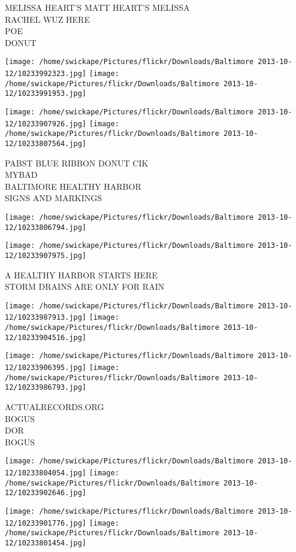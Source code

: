 \documentclass[10pt,letterpaper]{article}
\begin{document}
MELISSA HEART'S MATT HEART'S MELISSA\\
RACHEL WUZ HERE\\
POE\\
DONUT
\pagebreak

\texttt{[image: /home/swickape/Pictures/flickr/Downloads/Baltimore 2013-10-12/10233992323.jpg]}
\texttt{[image: /home/swickape/Pictures/flickr/Downloads/Baltimore 2013-10-12/10233991953.jpg]}

\texttt{[image: /home/swickape/Pictures/flickr/Downloads/Baltimore 2013-10-12/10233907926.jpg]}
\texttt{[image: /home/swickape/Pictures/flickr/Downloads/Baltimore 2013-10-12/10233807564.jpg]}

PABST BLUE RIBBON DONUT CIK\\
MYBAD\\
BALTIMORE HEALTHY HARBOR\\
SIGNS AND MARKINGS
\pagebreak

\texttt{[image: /home/swickape/Pictures/flickr/Downloads/Baltimore 2013-10-12/10233806794.jpg]}

\vspace{0.25in}
\texttt{[image: /home/swickape/Pictures/flickr/Downloads/Baltimore 2013-10-12/10233907975.jpg]}

A HEALTHY HARBOR STARTS HERE\\
STORM DRAINS ARE ONLY FOR RAIN
\pagebreak

\texttt{[image: /home/swickape/Pictures/flickr/Downloads/Baltimore 2013-10-12/10233987913.jpg]}
\texttt{[image: /home/swickape/Pictures/flickr/Downloads/Baltimore 2013-10-12/10233904516.jpg]}

\texttt{[image: /home/swickape/Pictures/flickr/Downloads/Baltimore 2013-10-12/10233906395.jpg]}
\texttt{[image: /home/swickape/Pictures/flickr/Downloads/Baltimore 2013-10-12/10233986793.jpg]}

ACTUALRECORDS.ORG\\
BOGUS\\
DOR\\
BOGUS
\pagebreak

\texttt{[image: /home/swickape/Pictures/flickr/Downloads/Baltimore 2013-10-12/10233804054.jpg]}
\texttt{[image: /home/swickape/Pictures/flickr/Downloads/Baltimore 2013-10-12/10233902646.jpg]}

\texttt{[image: /home/swickape/Pictures/flickr/Downloads/Baltimore 2013-10-12/10233901776.jpg]}
\texttt{[image: /home/swickape/Pictures/flickr/Downloads/Baltimore 2013-10-12/10233801454.jpg]}
\end{document}
